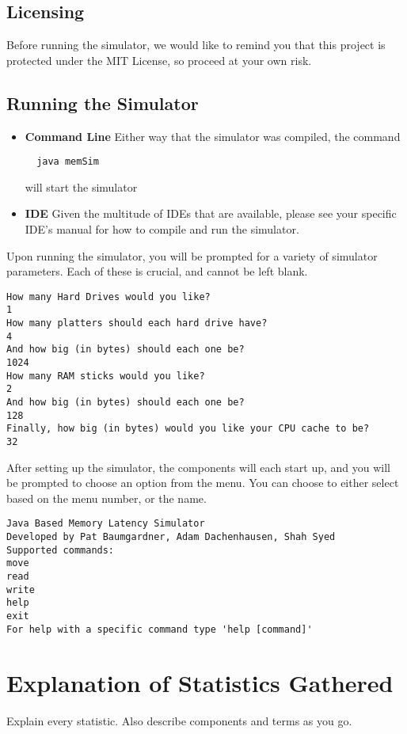 \documentclass[12pt]{article}
\begin{document}
\subsection{Licensing}
Before running the simulator, we would like to remind you that this
project is protected under the MIT License, so proceed at your own risk.

\subsection{Running the Simulator}
\begin{itemize}
\item \textbf{Command Line}
  Either way that the simulator was compiled, the command
\begin{verbatim}
  java memSim
\end{verbatim}
  will start the simulator
\item \textbf{IDE}
  Given the multitude of IDEs that are available, please see your
  specific IDE's manual for how to compile and run the simulator.
\end{itemize}
Upon running the simulator, you will be prompted for a variety of 
simulator parameters. Each of these is crucial, and cannot be left blank.
\begin{verbatim}
How many Hard Drives would you like?
1
How many platters should each hard drive have?
4
And how big (in bytes) should each one be?
1024
How many RAM sticks would you like?
2
And how big (in bytes) should each one be?
128
Finally, how big (in bytes) would you like your CPU cache to be?
32
\end{verbatim}
After setting up the simulator, the components will each start up, and
you will be prompted to choose an option from the menu. You can choose to either
select based on the menu number, or the name.
\begin{verbatim}
Java Based Memory Latency Simulator
Developed by Pat Baumgardner, Adam Dachenhausen, Shah Syed
Supported commands:
move
read
write
help
exit
For help with a specific command type 'help [command]'
\end{verbatim}


\section{Explanation of Statistics Gathered}
\label{sec:expstats}

Explain every statistic. 
Also describe components and terms as you go. 
\end{document}
